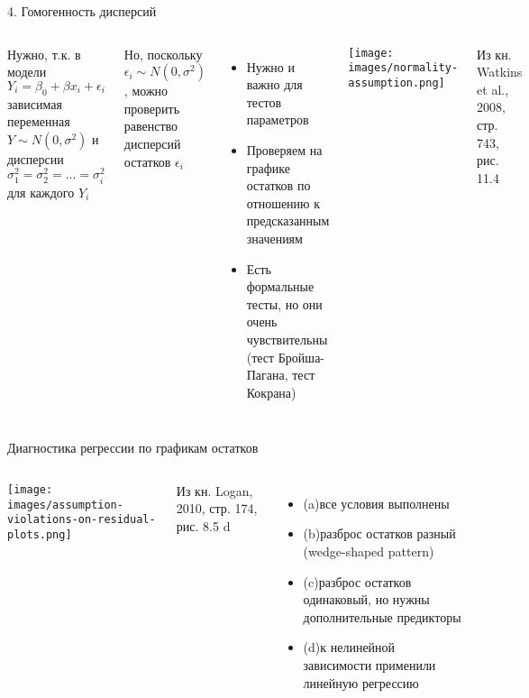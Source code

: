 \documentclass[
  ignorenonframetext,
  t,xcolor=table]{beamer}
\providecommand{\tightlist}{%
  \setlength{\itemsep}{0pt}\setlength{\parskip}{0pt}}
\newcommand{\columnsbegin}{\begin{columns}[T]}
\newcommand{\columnsend}{\end{columns}}
\begin{document}
\begin{frame}{4. Гомогенность дисперсий}
\protect\hypertarget{ux433ux43eux43cux43eux433ux435ux43dux43dux43eux441ux442ux44c-ux434ux438ux441ux43fux435ux440ux441ux438ux439}{}
\columnsbegin
{}

Нужно, т.к. в модели \(Y _i = \beta _0 + \beta x _i + \epsilon _i\)
зависимая переменная \(Y \sim N(0,\sigma^2)\) и дисперсии
\(\sigma^2 _1 = \sigma^2 _2 = ... = \sigma^2 _i\) для каждого \(Y _i\)

\par

Но, поскольку \(\epsilon _i \sim N(0,\sigma^2)\), можно проверить
равенство дисперсий остатков \(\epsilon _i\)

\begin{itemize}
\tightlist
\item
  Нужно и важно для тестов параметров
\item
  Проверяем на графике остатков по отношению к предсказанным значениям
\item
  Есть формальные тесты, но они очень чувствительны (тест Бройша-Пагана,
  тест Кокрана)
\end{itemize}


\centering

\texttt{[image: images/normality-assumption.png]}

\raggedright

\tiny Из кн. Watkins et al., 2008, стр. 743, рис. 11.4

\columnsend
\end{frame}

\begin{frame}{Диагностика регрессии по графикам остатков}
\protect\hypertarget{ux434ux438ux430ux433ux43dux43eux441ux442ux438ux43aux430-ux440ux435ux433ux440ux435ux441ux441ux438ux438-ux43fux43e-ux433ux440ux430ux444ux438ux43aux430ux43c-ux43eux441ux442ux430ux442ux43aux43eux432}{}
\columnsbegin
{}

\centering

\texttt{[image: images/assumption-violations-on-residual-plots.png]}

\raggedright

\tiny Из кн. Logan, 2010, стр. 174, рис. 8.5 d


\begin{itemize}
\tightlist
\item
  (a)все условия выполнены\\
\item
  (b)разброс остатков разный (wedge-shaped pattern)\\
\item
  (c)разброс остатков одинаковый, но нужны дополнительные предикторы\\
\item
  (d)к нелинейной зависимости применили линейную регрессию
\end{itemize}

\columnsend
\end{frame}
\end{document}
